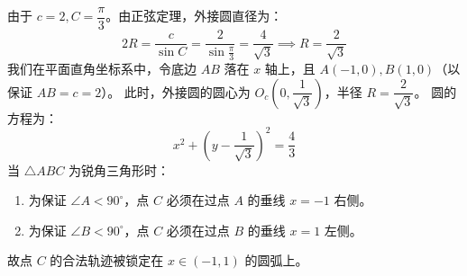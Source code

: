 \documentclass[11pt, a4paper]{ctexart}
\begin{document}
\begin{minipage}[c]{0.52\textwidth}
由于 $c=2, C = \dfrac{\pi}{3}$。由正弦定理，外接圆直径为：
\[
2R = \frac{c}{\sin C} = \frac{2}{\sin\frac{\pi}{3}} = \frac{4}{\sqrt{3}} \implies R = \frac{2}{\sqrt{3}}
\]
我们在平面直角坐标系中，令底边 $AB$ 落在 $x$ 轴上，且 $A(-1,0), B(1,0)$（以保证 $AB = c = 2$）。
此时，外接圆的圆心为 $O_c\left(0, \dfrac{1}{\sqrt{3}}\right)$，半径 $R = \dfrac{2}{\sqrt{3}}$。
圆的方程为：
\[
x^2 + \left(y - \frac{1}{\sqrt{3}}\right)^2 = \frac{4}{3}
\]
当 $\triangle ABC$ 为锐角三角形时：
\begin{enumerate}
  \item 为保证 $\angle A < 90^\circ$，点 $C$ 必须在过点 $A$ 的垂线 $x = -1$ 右侧。
  \item 为保证 $\angle B < 90^\circ$，点 $C$ 必须在过点 $B$ 的垂线 $x = 1$ 左侧。
\end{enumerate}
故点 $C$ 的合法轨迹被锁定在 $x \in (-1, 1)$ 的圆弧上。
\end{minipage}\hfill
\end{document}
